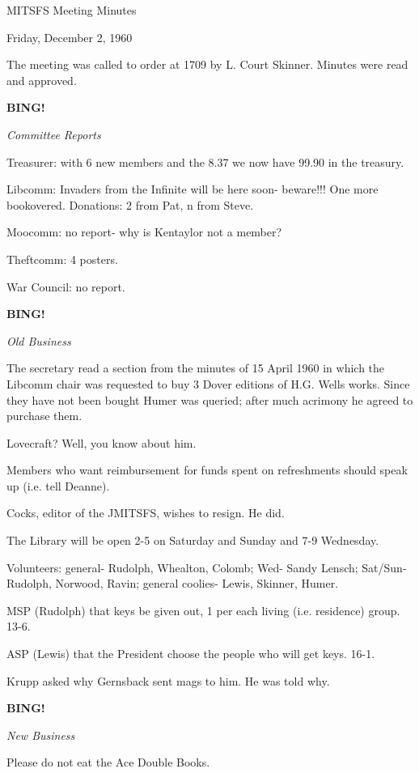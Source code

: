 \documentclass[12pt]{article}
\newcommand{\bing}{{\bf BING!} }
\newcommand{\goto}[1]{\bing \vskip 12pt \centerline{{\em{#1}}}}
\begin{document}
\begin{center}

MITSFS Meeting Minutes

Friday, December 2, 1960

\end{center}
 
\vspace{12pt}

\setlength{\parskip}{6pt}

\noindent
The meeting was called to order at 1709 by L. Court Skinner. Minutes were read and approved.

\goto{Committee Reports}

Treasurer: with 6 new members and the 8.37 we now have 99.90 in the treasury.

Libcomm: Invaders from the Infinite will be here soon- beware!!! One more bookovered. Donations: 2 from Pat, n from Steve.

Moocomm: no report- why is Kentaylor not a member?

Theftcomm: 4 posters.

War Council: no report.

\goto{Old Business}

The secretary read a section from the minutes of 15 April 1960 in which the Libcomm chair was requested to buy 3 Dover editions of H.G. Wells works. Since they have not been bought Humer was queried; after much acrimony he agreed to purchase them.

Lovecraft? Well, you know about him.

Members who want reimbursement for funds spent on refreshments should speak up (i.e. tell Deanne).

Cocks, editor of the JMITSFS, wishes to resign. He did.

The Library will be open 2-5 on Saturday and Sunday and 7-9 Wednesday.

Volunteers: general- Rudolph, Whealton, Colomb; Wed- Sandy Lensch; Sat/Sun- Rudolph, Norwood, Ravin; general coolies- Lewis, Skinner, Humer.

MSP (Rudolph) that keys be given out, 1 per each living (i.e. residence) group. 13-6.

ASP (Lewis) that the President choose the people who will get keys. 16-1.

Krupp asked why Gernsback sent mags to him. He was told why.

\goto{New Business}

Please do not eat the Ace Double Books.
\end{document}
